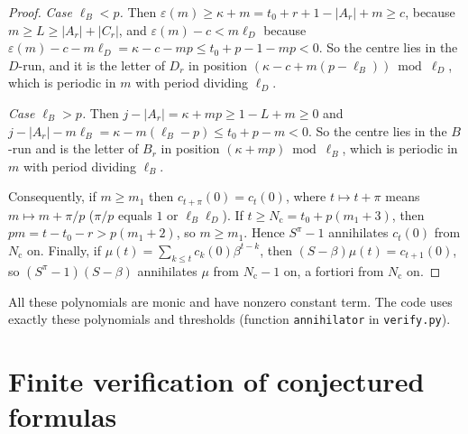 \documentclass[11pt]{article}
\theoremstyle{definition}
\theoremstyle{remark}
\begin{document}
\begin{proof}
\emph{Case $\ell_B<p$.} Then $\varepsilon(m)\ge\kappa+m=t_0+r+1-|A_r|+m\ge c$, because $m\ge L\ge|A_r|+|C_r|$, and $\varepsilon(m)-c<m\ell_D$ because $\varepsilon(m)-c-m\ell_D=\kappa-c-mp\le t_0+p-1-mp<0$. So the centre lies in the $D$-run, and it is the letter of $D_r$ in position $(\kappa-c+m(p-\ell_B))\bmod\ell_D$, which is periodic in $m$ with period dividing $\ell_D$.

\emph{Case $\ell_B>p$.} Then $j-|A_r|=\kappa+mp\ge 1-L+m\ge0$ and $j-|A_r|-m\ell_B=\kappa-m(\ell_B-p)\le t_0+p-m<0$. So the centre lies in the $B$-run and is the letter of $B_r$ in position $(\kappa+mp)\bmod\ell_B$, which is periodic in $m$ with period dividing $\ell_B$.

Consequently, if $m\ge m_1$ then $c_{t+\pi}(0)=c_t(0)$, where $t\mapsto t+\pi$ means $m\mapsto m+\pi/p$ ($\pi/p$ equals $1$ or $\ell_B\ell_D$). If $t\ge N_{\mathrm c}=t_0+p(m_1+3)$, then $pm=t-t_0-r>p(m_1+2)$, so $m\ge m_1$. Hence $S^\pi-1$ annihilates $c_t(0)$ from $N_{\mathrm c}$ on. Finally, if $\mu(t)=\sum_{k\le t}c_k(0)\beta^{t-k}$, then $(S-\beta)\mu(t)=c_{t+1}(0)$, so $(S^\pi-1)(S-\beta)$ annihilates $\mu$ from $N_{\mathrm c}-1$ on, a fortiori from $N_{\mathrm c}$ on.
\end{proof}

All these polynomials are monic and have nonzero constant term. The code uses exactly these polynomials and thresholds (function \texttt{annihilator} in \texttt{verify.py}).

\section{Finite verification of conjectured formulas}
\end{document}
